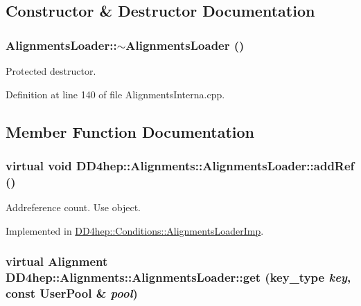 \subsection{Constructor \& Destructor Documentation}
\hypertarget{class_d_d4hep_1_1_alignments_1_1_alignments_loader_af2ad650d826e5656254929ae956ee2ef}{
\subsubsection[{$\sim$AlignmentsLoader}]{\setlength{\rightskip}{0pt plus 5cm}AlignmentsLoader::$\sim$AlignmentsLoader ()}}
\label{class_d_d4hep_1_1_alignments_1_1_alignments_loader_af2ad650d826e5656254929ae956ee2ef}


Protected destructor. 

Definition at line 140 of file AlignmentsInterna.cpp.

\subsection{Member Function Documentation}
\hypertarget{class_d_d4hep_1_1_alignments_1_1_alignments_loader_a47a4586ac933395c27b705939985f41f}{
\subsubsection[{addRef}]{\setlength{\rightskip}{0pt plus 5cm}virtual void DD4hep::Alignments::AlignmentsLoader::addRef ()}}
\label{class_d_d4hep_1_1_alignments_1_1_alignments_loader_a47a4586ac933395c27b705939985f41f}


Addreference count. Use object. 

Implemented in \hyperlink{class_d_d4hep_1_1_conditions_1_1_alignments_loader_imp_ac4797b3da6e5543cf505eca8bf9cb405}{DD4hep::Conditions::AlignmentsLoaderImp}.\hypertarget{class_d_d4hep_1_1_alignments_1_1_alignments_loader_a19ca11e6b9485acd5797d509ea5b4b97}{
\subsubsection[{get}]{\setlength{\rightskip}{0pt plus 5cm}virtual {\bf Alignment} DD4hep::Alignments::AlignmentsLoader::get ({\bf key\_\-type} {\em key}, \/  const UserPool \& {\em pool})}}
\label{class_d_d4hep_1_1_alignments_1_1_alignments_loader_a19ca11e6b9485acd5797d509ea5b4b97}


